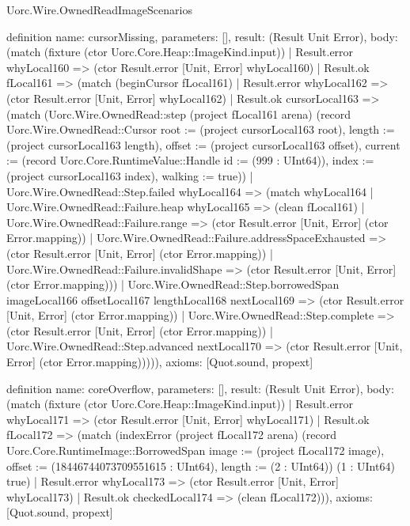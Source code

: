 \begin{lexlean}{Uorc.Wire.OwnedReadImageScenarios}
\begin{semanticmodule}
definition{
  name: cursorMissing,
  parameters: [],
  result: (Result Unit Error),
  body: (match (fixture (ctor Uorc.Core.Heap::ImageKind.input))
    | Result.error whyLocal160 => (ctor Result.error [Unit, Error] whyLocal160)
    | Result.ok fLocal161 => (match (beginCursor fLocal161)
      | Result.error whyLocal162 => (ctor Result.error [Unit, Error] whyLocal162)
      | Result.ok cursorLocal163 => (match (Uorc.Wire.OwnedRead::step (project fLocal161 arena) (record Uorc.Wire.OwnedRead::Cursor {root := (project cursorLocal163 root), length := (project cursorLocal163 length), offset := (project cursorLocal163 offset), current := (record Uorc.Core.RuntimeValue::Handle {id := (999 : UInt64)}), index := (project cursorLocal163 index), walking := true}))
        | Uorc.Wire.OwnedRead::Step.failed whyLocal164 => (match whyLocal164
          | Uorc.Wire.OwnedRead::Failure.heap whyLocal165 => (clean fLocal161)
          | Uorc.Wire.OwnedRead::Failure.range => (ctor Result.error [Unit, Error] (ctor Error.mapping))
          | Uorc.Wire.OwnedRead::Failure.addressSpaceExhausted => (ctor Result.error [Unit, Error] (ctor Error.mapping))
          | Uorc.Wire.OwnedRead::Failure.invalidShape => (ctor Result.error [Unit, Error] (ctor Error.mapping)))
        | Uorc.Wire.OwnedRead::Step.borrowedSpan imageLocal166 offsetLocal167 lengthLocal168 nextLocal169 => (ctor Result.error [Unit, Error] (ctor Error.mapping))
        | Uorc.Wire.OwnedRead::Step.complete => (ctor Result.error [Unit, Error] (ctor Error.mapping))
        | Uorc.Wire.OwnedRead::Step.advanced nextLocal170 => (ctor Result.error [Unit, Error] (ctor Error.mapping))))),
  axioms: [Quot.sound, propext]
}

definition{
  name: coreOverflow,
  parameters: [],
  result: (Result Unit Error),
  body: (match (fixture (ctor Uorc.Core.Heap::ImageKind.input))
    | Result.error whyLocal171 => (ctor Result.error [Unit, Error] whyLocal171)
    | Result.ok fLocal172 => (match (indexError (project fLocal172 arena) (record Uorc.Core.RuntimeImage::BorrowedSpan {image := (project fLocal172 image), offset := (18446744073709551615 : UInt64), length := (2 : UInt64)}) (1 : UInt64) true)
      | Result.error whyLocal173 => (ctor Result.error [Unit, Error] whyLocal173)
      | Result.ok checkedLocal174 => (clean fLocal172))),
  axioms: [Quot.sound, propext]
}


\end{semanticmodule}
\end{lexlean}
